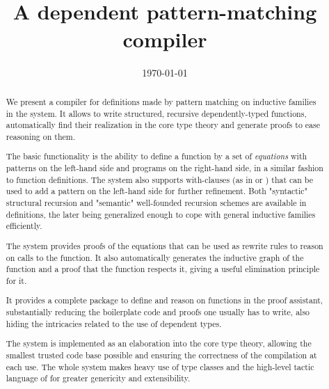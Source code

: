 \documentclass{llncs}
\author{\theauthor}
\date{\today}
\institute{\myaffiliation
  \\\email{\mymail}}
\title{\Equations\\
  A dependent pattern-matching compiler}
\begin{document}
\maketitle

\begin{abstract}
  We present a compiler for definitions made by pattern matching on
  inductive families in the \Coq system. It allows to write structured,
  recursive dependently-typed functions, automatically find their
  realization in the core type theory and generate proofs to ease
  reasoning on them.
  
  The basic functionality is the ability to define a function by a set
  of \textit{equations} with patterns on the left-hand side and programs
  on the right-hand side, in a similar fashion to \Haskell
  function definitions. The system also supports with-clauses (as in
  \Epigram or \Agda) that can be used to add a pattern on the left-hand
  side for further refinement. Both "syntactic" structural recursion and
  "semantic" well-founded recursion schemes are available in definitions,
  the later being generalized enough to cope with general inductive
  families efficiently.
  
  The system provides proofs of the equations that can be used as
  rewrite rules to reason on calls to the function. It also
  automatically generates the inductive graph of the function and a
  proof that the function respects it, giving a useful elimination
  principle for it.

  It provides a complete package to define 
  and reason on functions in the proof assistant, substantially
  reducing the boilerplate code and proofs one usually has to write, 
  also hiding the intricacies related to the use of dependent types.
  
  The system is implemented as an elaboration into the core \Coq type
  theory, allowing the smallest trusted code base possible and ensuring 
  the correctness of the compilation at each use.
  The whole system makes heavy use of type classes and the high-level
  tactic language of \Coq for greater genericity and extensibility.
\end{abstract}







  


\end{document}
